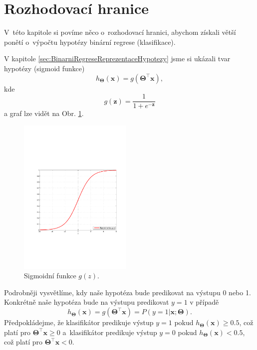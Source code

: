 \section{Rozhodovací hranice}
\label{sec:BinarniRegreseRozhodovaciHranice}

\par{V~této kapitole si povíme něco o~rozhodovací hranici, abychom získali větší ponětí o~výpočtu hypotézy binární regrese (klasifikace).}

\par{V kapitole \ref{sec:BinarniRegreseReprezentaceHypotezy} jsme si ukázali tvar hypotézy (sigmoid funkce)
\begin{equation}
	h_{\bm{\Theta}} \left( \bm{x} \right) = g \left( \bm{\Theta}^{\top} \bm{x} \right),
\end{equation}
kde
\begin{equation}
	g \left( \bm{z} \right) = \frac{1}{1 + e^{-\bm{z}}}
\end{equation}
a graf lze vidět na Obr. \ref{fig:sigmoidFunction2}.
\begin{figure}[!ht]
	\centering
	\includegraphics[width = 0.48\textwidth, trim = 2.5cm 7cm 2cm 9cm]{./Img/BinarniRegrese/sigmoidFunkce/sigmoidFunction.pdf}
	\caption{Sigmoidní funkce $g \left( z \right)$.}
	\label{fig:sigmoidFunction2}
\end{figure}}

\par{Podrobněji vysvětlíme, kdy naše hypotéza bude predikovat na výstupu 0 nebo 1. Konkrétně naše hypotéza bude na výstupu predikovat $y = 1$ v případě
\begin{equation}
	h_{\bm{\Theta}} \left( \bm{x} \right) = g \left( \bm{\Theta}^{\top} \bm{x} \right) = P \left( y = 1 | \bm{x}; \bm{\Theta} \right).
\end{equation}
Předpokládejme, že klasifikátor predikuje výstup $y = 1$ pokud $h_{\bm{\Theta}} \left( \bm{x} \right) \geq 0.5$, což platí pro $\bm{\Theta}^{\top} \bm{x} \geq 0$ a~klasifikátor predikuje výstup $y = 0$ pokud $h_{\bm{\Theta}} \left( \bm{x} \right) < 0.5$, což platí pro $\bm{\Theta}^{\top} \bm{x} < 0$.}


